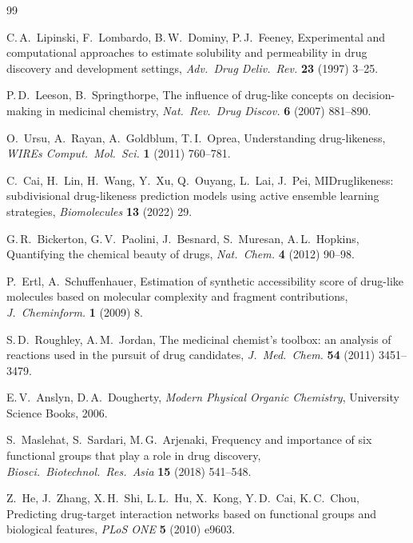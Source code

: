 \documentclass[10pt,a4paper,twocolumn]{article}
\begin{document}
\begin{thebibliography}{99}
\footnotesize

C.\,A.~Lipinski, F.~Lombardo, B.\,W.~Dominy, P.\,J.~Feeney,
Experimental and computational approaches to estimate solubility and permeability in drug discovery and development settings,
\textit{Adv.\ Drug Deliv.\ Rev.} \textbf{23} (1997) 3--25.

P.\,D.~Leeson, B.~Springthorpe,
The influence of drug-like concepts on decision-making in medicinal chemistry,
\textit{Nat.\ Rev.\ Drug Discov.} \textbf{6} (2007) 881--890.

O.~Ursu, A.~Rayan, A.~Goldblum, T.\,I.~Oprea,
Understanding drug-likeness,
\textit{WIREs Comput.\ Mol.\ Sci.} \textbf{1} (2011) 760--781.

C.~Cai, H.~Lin, H.~Wang, Y.~Xu, Q.~Ouyang, L.~Lai, J.~Pei,
MIDruglikeness: subdivisional drug-likeness prediction models using active ensemble learning strategies,
\textit{Biomolecules} \textbf{13} (2022) 29.

G.\,R.~Bickerton, G.\,V.~Paolini, J.~Besnard, S.~Muresan, A.\,L.~Hopkins,
Quantifying the chemical beauty of drugs,
\textit{Nat.\ Chem.} \textbf{4} (2012) 90--98.

P.~Ertl, A.~Schuffenhauer,
Estimation of synthetic accessibility score of drug-like molecules based on molecular complexity and fragment contributions,
\textit{J.\ Cheminform.} \textbf{1} (2009) 8.

S.\,D.~Roughley, A.\,M.~Jordan,
The medicinal chemist's toolbox: an analysis of reactions used in the pursuit of drug candidates,
\textit{J.\ Med.\ Chem.} \textbf{54} (2011) 3451--3479.

E.\,V.~Anslyn, D.\,A.~Dougherty,
\textit{Modern Physical Organic Chemistry},
University Science Books, 2006.

S.~Maslehat, S.~Sardari, M.\,G.~Arjenaki,
Frequency and importance of six functional groups that play a role in drug discovery,
\textit{Biosci.\ Biotechnol.\ Res.\ Asia} \textbf{15} (2018) 541--548.

Z.~He, J.~Zhang, X.\,H.~Shi, L.\,L.~Hu, X.~Kong, Y.\,D.~Cai, K.\,C.~Chou,
Predicting drug-target interaction networks based on functional groups and biological features,
\textit{PLoS ONE} \textbf{5} (2010) e9603.


\end{thebibliography}
\end{document}
